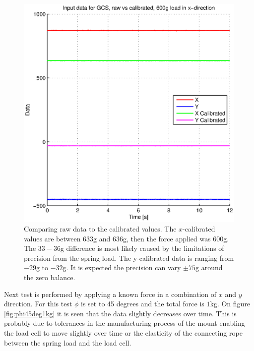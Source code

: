 \begin{figure}[hbtp]
\centering
\includegraphics[scale=1]{graphics/gcs_test/calib_result_compare.eps}
\caption[Comparing raw data from load cells to the calibrated values]{Comparing raw data to the calibrated values. The $x$-calibrated values are between $633$g and $636$g, then the force applied was $600$g. The $33-36$g difference is most likely caused by the limitations of precision from the spring load. The y-calibrated data is ranging from $-29$g to $-32$g. It is expected the precision can vary $\pm75$g around the zero balance.}
\end{figure}

\noindent
Next test is performed by applying a known force in a combination of $x$ and $y$ direction. For this test $\phi$ is set to 45 degrees and the total force is $1$kg. On figure \ref{fig:phi45deg1kg} it is seen that the data slightly decreases over time. This is probably due to tolerances in the manufacturing process of the mount enabling the load cell to move slightly over time or the elasticity of the connecting rope between the spring load and the load cell.


